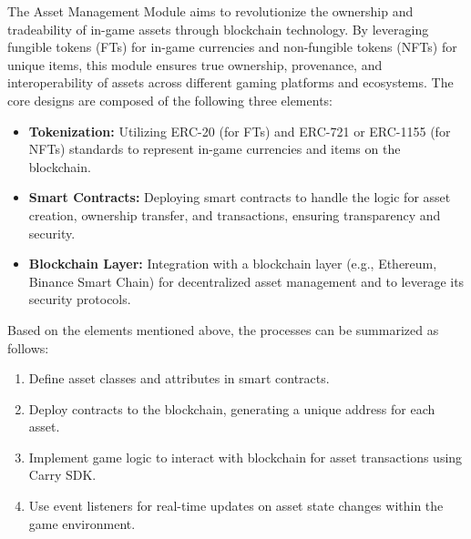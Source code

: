 The Asset Management Module aims to revolutionize the ownership and tradeability of in-game assets through blockchain technology. By leveraging fungible tokens (FTs) for in-game currencies and non-fungible tokens (NFTs) for unique items, this module ensures true ownership, provenance, and interoperability of assets across different gaming platforms and ecosystems. The core designs are composed of the following three elements:
\begin{itemize}
    \item \textbf{Tokenization:} Utilizing ERC-20 (for FTs) and ERC-721 or ERC-1155 (for NFTs) standards to represent in-game currencies and items on the blockchain.
\item \textbf{Smart Contracts:} Deploying smart contracts to handle the logic for asset creation, ownership transfer, and transactions, ensuring transparency and security.
\item \textbf{Blockchain Layer:} Integration with a blockchain layer (e.g., Ethereum, Binance Smart Chain) for decentralized asset management and to leverage its security protocols.
\end{itemize}

Based on the elements mentioned above, the processes can be summarized as follows: 
\begin{enumerate}
    \item Define asset classes and attributes in smart contracts.
    \item Deploy contracts to the blockchain, generating a unique address for each asset.
    \item Implement game logic to interact with blockchain for asset transactions using Carry SDK.
    \item Use event listeners for real-time updates on asset state changes within the game environment.
\end{enumerate}




